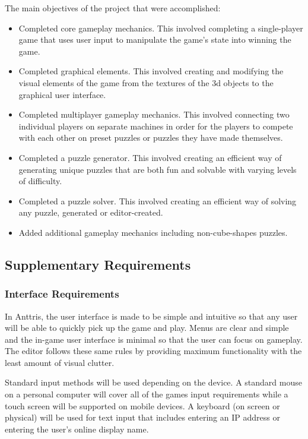 \documentclass[12pt]{article}
\begin{document}
The main objectives of the project that were accomplished:
\begin{itemize}
 \item Completed core gameplay mechanics. This involved completing a single-player game that uses user input to manipulate the game's state into winning the game.
 \item Completed graphical elements. This involved creating and modifying the visual elements of the game from the textures of the 3d objects to the graphical user interface.
 \item Completed multiplayer gameplay mechanics. This involved connecting two individual players on separate machines in order for the players to compete with each other on preset puzzles or puzzles they have made themselves.
 \item Completed a puzzle generator. This involved creating an efficient way of generating unique puzzles that are both fun and solvable with varying levels of difficulty.
 \item Completed a puzzle solver. This involved creating an efficient way of solving any puzzle, generated or editor-created.
 \item Added additional gameplay mechanics including non-cube-shapes puzzles.
\end{itemize}
\subsection{Supplementary Requirements} %
\subsubsection{Interface Requirements}
In Anttris, the user interface is made to be simple and intuitive so that any user will be able to quickly pick up the game and play. Menus are clear and simple and the in-game user interface is minimal so that the user can focus on gameplay. The editor follows these same rules by providing maximum functionality with the least amount of visual clutter.

Standard input methods will be used depending on the device. A standard mouse on a personal computer will cover all of the games input requirements while a touch screen will be supported on mobile devices. A keyboard (on screen or physical) will be used for text input that includes entering an IP address or entering the user's online display name.
\end{document}
